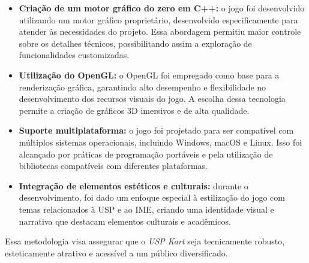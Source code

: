\begin{itemize}

\item \textbf{Criação de um motor gráfico do zero em C++:} o jogo foi desenvolvido utilizando um motor gráfico proprietário, desenvolvido especificamente para atender às necessidades do projeto. Essa abordagem permitiu maior controle sobre os detalhes técnicos, possibilitando assim a exploração de funcionalidades customizadas.
    
\item \textbf{Utilização do OpenGL:} o OpenGL foi empregado como base para a renderização gráfica, garantindo alto desempenho e flexibilidade no desenvolvimento dos recursos visuais do jogo. A escolha dessa tecnologia permite a criação de gráficos 3D imersivos e de alta qualidade.
    
\item \textbf{Suporte multiplataforma:} o jogo foi projetado para ser compatível com múltiplos sistemas operacionais, incluindo Windows, macOS e Linux. Isso foi alcançado por práticas de programação portáveis e pela utilização de bibliotecas compatíveis com diferentes plataformas.
    
\item \textbf{Integração de elementos estéticos e culturais:} durante o desenvolvimento, foi dado um enfoque especial à estilização do jogo com temas relacionados à USP e ao IME, criando uma identidade visual e narrativa que destacam elementos culturais e acadêmicos.
    
\end{itemize}
    
Essa metodologia visa assegurar que o \textit{USP Kart} seja tecnicamente robusto, esteticamente atrativo e acessível a um público diversificado.